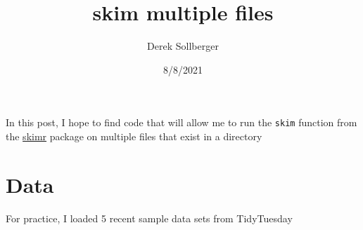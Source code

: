 \documentclass[
]{article}
\title{skim multiple files}
\author{Derek Sollberger}
\date{8/8/2021}
\newenvironment{Shaded}{\begin{snugshade}}{\end{snugshade}}
\newcommand{\AttributeTok}[1]{\textcolor[rgb]{0.77,0.63,0.00}{#1}}
\newcommand{\ConstantTok}[1]{\textcolor[rgb]{0.00,0.00,0.00}{#1}}
\newcommand{\FunctionTok}[1]{\textcolor[rgb]{0.00,0.00,0.00}{#1}}
\newcommand{\NormalTok}[1]{#1}
\newcommand{\SpecialCharTok}[1]{\textcolor[rgb]{0.00,0.00,0.00}{#1}}
\newcommand{\StringTok}[1]{\textcolor[rgb]{0.31,0.60,0.02}{#1}}
\begin{document}
\maketitle

{
\setcounter{tocdepth}{2}
\tableofcontents
}
\begin{Shaded}
\end{Shaded}

In this post, I hope to find code that will allow me to run the
\texttt{skim} function from the
\href{https://cran.r-project.org/web/packages/skimr/index.html}{skimr}
package on multiple files that exist in a directory

\hypertarget{data}{%
\section{Data}\label{data}}

For practice, I loaded 5 recent sample data sets from TidyTuesday
\end{document}
